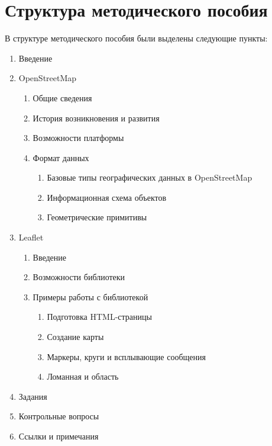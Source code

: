 \documentclass[a4paper, 14pt]{extreport}
\begin{document}
    \chapter{Структура методического пособия}
    В структуре методического пособия были выделены следующие пункты:
    \begin{enumerate}
        \item Введение
        \item OpenStreetMap
        \begin{enumerate}
            \item Общие сведения
            \item История возникновения и развития
            \item Возможности платформы
            \item Формат данных
            \begin{enumerate}
                \item Базовые типы географических данных в OpenStreetMap
                \item Информационная схема объектов
                \item Геометрические примитивы
            \end{enumerate}
        \end{enumerate}
        \item Leaflet
        \begin{enumerate}
            \item Введение
            \item Возможности библиотеки
            \item Примеры работы с библиотекой
            \begin{enumerate}
                \item Подготовка HTML-страницы
                \item Создание карты
                \item Маркеры, круги и всплывающие сообщения
                \item Ломанная и область
            \end{enumerate}
        \end{enumerate}
        \item Задания
        \item Контрольные вопросы
        \item Ссылки и примечания
    \end{enumerate}

    \newpage
\end{document}
